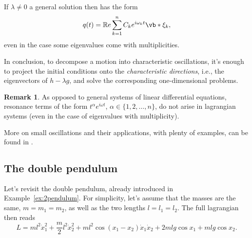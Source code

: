 \documentclass[english,fontsize=11pt,paper=b5]{scrbook}
\theoremstyle{definition}
\newtheorem{remark}{Remark}[chapter]
\begin{document}
    If $\lambda\neq 0$ a general solution then has the form
    \begin{equation}
      q(t) = \mathbb{R}e \sum_{k=1}^n C_k e^{i \omega_k t}\vb*{\xi}_k,
    \end{equation}
    even in the case some eigenvalues come with multiplicities.

    In conclusion, to decompose a motion into characteristic oscillations, it's enough to project the initial conditions onto the \emph{characteristic directions}, i.e., the eigenvectors of $h - \lambda g$, and solve the corresponding one-dimensional problems.

    \begin{remark}
      As opposed to general systems of linear differential equations, resonance terms of the form $t^\alpha e^{i \omega t}$, $\alpha\in\big\{1,2,\ldots,n\big\}$, do not arise in lagrangian systems (even in the case of eigenvalues with multiplicity).
    \end{remark}

    More on small oscillations and their applications, with plenty of examples, can be found in \cite[Chapters 23--25]{book:arnold}.

    \subsection{The double pendulum}
    Let's revisit the double pendulum, already introduced in Example~\ref{ex:2pendulum}.
    For simplicity, let's assume that the masses are the same, $m = m_1 = m_2$, as well as the two lengths $l = l_1 = l_2$.
    The full lagrangian then reads
    \begin{equation}
      L = m l^2 \dot x_1^2
      + \frac m2 l^2 \dot x_2^2
      + m l^2 \cos(x_1 -x_2)\dot x_1 \dot x_2
      + 2ml g \cos x_1
      + mlg\cos x_2.
    \end{equation}
\end{document}
